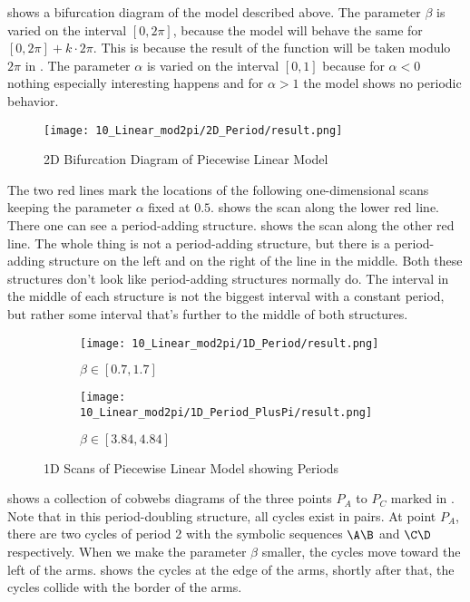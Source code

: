  shows a bifurcation diagram of the model described above.
The parameter $\beta$ is varied on the interval $[0, 2 \pi]$, because the model will behave the same for $[0, 2 \pi] + k \cdot 2 \pi$.
This is because the result of the function will be taken modulo $2 \pi$ in .
The parameter $\alpha$ is varied on the interval $[0, 1]$ because for $\alpha < 0$ nothing especially interesting happens and for $\alpha > 1$ the model shows no periodic behavior.

\begin{figure}
	\centering
	\texttt{[image: 10\_Linear\_mod2pi/2D\_Period/result.png]}
	\caption{2D Bifurcation Diagram of Piecewise Linear Model}
	\label{fig:pcw.lin.2d}
\end{figure}

The two red lines mark the locations of the following one-dimensional scans keeping the parameter $\alpha$ fixed at $0.5$.
 shows the scan along the lower red line.
There one can see a period-adding structure.
 shows the scan along the other red line.
The whole thing is not a period-adding structure, but there is a period-adding structure on the left and on the right of the line in the middle.
Both these structures don't look like period-adding structures normally do.
The interval in the middle of each structure is not the biggest interval with a constant period, but rather some interval that's further to the middle of both structures.

\begin{figure}
	\centering
	\begin{subfigure}{0.4\textwidth}
		\centering
		\texttt{[image: 10\_Linear\_mod2pi/1D\_Period/result.png]}
		\caption{$\beta \in [0.7, 1.7]$}
		\label{fig:pcw.lin.1D}
	\end{subfigure}
	\begin{subfigure}{0.4\textwidth}
		\centering
		\texttt{[image: 10\_Linear\_mod2pi/1D\_Period\_PlusPi/result.png]}
		\caption{$\beta \in [3.84, 4.84]$}
		\label{fig:pcw.lin.1DPlusPi}
	\end{subfigure}
	\caption{1D Scans of Piecewise Linear Model showing Periods}
\end{figure}

 shows a collection of cobwebs diagrams of the three points $P_A$ to $P_C$ marked in .
Note that in this period-doubling structure, all cycles exist in pairs.
At point $P_A$, there are two cycles of period 2 with the symbolic sequences $\A\B$ and $\C\D$ respectively.
When we make the parameter $\beta$ smaller, the cycles move toward the left of the arms.
 shows the cycles at the edge of the arms, shortly after that, the cycles collide with the border of the arms.

